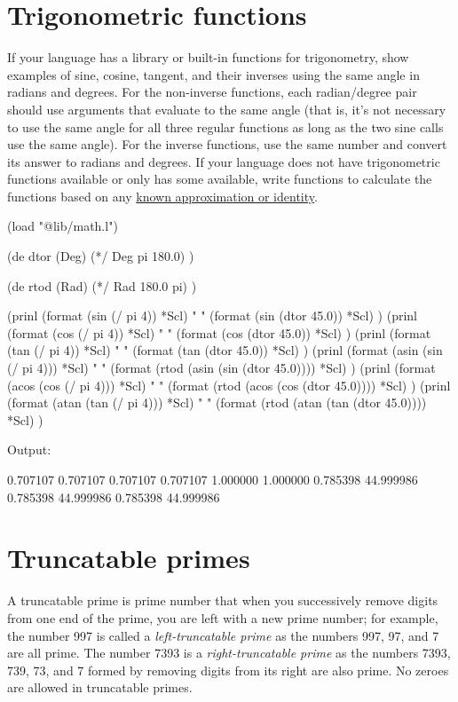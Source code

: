 \pagebreak{}
\section*{Trigonometric functions}

If your language has a library or built-in functions for trigonometry,
show examples of sine, cosine, tangent, and their inverses using the
same angle in radians and degrees. For the non-inverse functions, each
radian/degree pair should use arguments that evaluate to the same angle
(that is, it's not necessary to use the same angle for all three regular
functions as long as the two sine calls use the same angle). For the
inverse functions, use the same number and convert its answer to radians
and degrees. If your language does not have trigonometric functions
available or only has some available, write functions to calculate the
functions based on any
\href{http://en.wikipedia.org/wiki/List\_of\_trigonometric\_identities}{known
approximation or identity}.


\begin{wideverbatim}

(load "@lib/math.l")

(de dtor (Deg)
   (*/ Deg pi 180.0) )

(de rtod (Rad)
   (*/ Rad 180.0 pi) )

(prinl
   (format (sin (/ pi 4)) *Scl) " " (format (sin (dtor 45.0)) *Scl) )
(prinl
   (format (cos (/ pi 4)) *Scl) " " (format (cos (dtor 45.0)) *Scl) )
(prinl
   (format (tan (/ pi 4)) *Scl) " " (format (tan (dtor 45.0)) *Scl) )
(prinl
   (format (asin (sin (/ pi 4))) *Scl) " "
   (format (rtod (asin (sin (dtor 45.0)))) *Scl) )
(prinl
   (format (acos (cos (/ pi 4))) *Scl) " "
   (format (rtod (acos (cos (dtor 45.0)))) *Scl) )
(prinl
   (format (atan (tan (/ pi 4))) *Scl) " "
   (format (rtod (atan (tan (dtor 45.0)))) *Scl) )

Output:

0.707107 0.707107
0.707107 0.707107
1.000000 1.000000
0.785398 44.999986
0.785398 44.999986
0.785398 44.999986

\end{wideverbatim}

\pagebreak{}
\section*{Truncatable primes}

A truncatable prime is prime number that when you successively remove
digits from one end of the prime, you are left with a new prime number;
for example, the number 997 is called a \emph{left-truncatable prime} as
the numbers 997, 97, and 7 are all prime. The number 7393 is a
\emph{right-truncatable prime} as the numbers 7393, 739, 73, and 7
formed by removing digits from its right are also prime. No zeroes are
allowed in truncatable primes.

